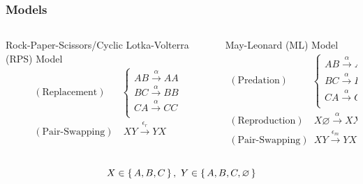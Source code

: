 \documentclass{beamer}
\begin{document}
    \begin{frame}
        \frametitle{Models}

                
        \begin{columns}
            \begin{column}{0.5\textwidth}
                \centering
                    Rock-Paper-Scissors/Cyclic Lotka-Volterra (RPS) Model
                        \begin{align*}
                            (\text{Replacement})  &
                            \left\{
                            \begin{matrix}
                            AB \xrightarrow{\alpha} AA\\
                            BC \xrightarrow{\alpha} BB\\
                            CA \xrightarrow{\alpha} CC\\
                            \end{matrix}
                            \right.\\
                            (\text{Pair-Swapping}) & \ XY \xrightarrow{\epsilon_r} YX \\
                        \end{align*}
            \end{column}
            \begin{column}{0.5\textwidth}
                \centering

                \vspace{-16pt}

                    May-Leonard (ML) Model
                        \begin{align*}
                            (\text{Predation}) & 
                            \left\{
                            \begin{matrix}
                            AB \xrightarrow{\alpha} A\varnothing\\
                            BC \xrightarrow{\alpha} B\varnothing\\
                            CA \xrightarrow{\alpha} C\varnothing\\
                            \end{matrix}
                            \right.\\
                            (\text{Reproduction}) & \ X \varnothing \xrightarrow{\alpha} XX \\
                            (\text{Pair-Swapping}) & \ XY \xrightarrow{\epsilon_m} YX 
                        \end{align*}
            \end{column}
        \end{columns}
        \begin{equation*}
            X \in \set{A, B, C}, \ Y \in \set{A, B, C, \varnothing}
        \end{equation*}
    \end{frame}
\end{document}

